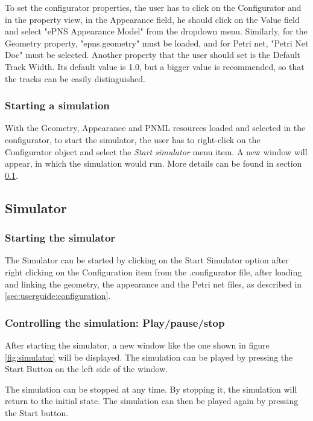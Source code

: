 To set the configurator properties, the user has to click on the Configurator and in the property view, in the Appearance field, he should click on the Value field and select "ePNS Appearance Model" from the dropdown menu. Similarly, for the Geometry property, "epns.geometry" must be loaded, and for Petri net, "Petri Net Doc" must be selected. Another property that the user should set is the Default Track Width. Its default value is 1.0, but a bigger value is recommended, so that the tracks can be easily distinguished.

\subsubsection{Starting a simulation}
With the Geometry, Appearance and PNML resources loaded and selected in the configurator, to start
the simulator, the user has to right-click on the Configurator object and select the \textit{Start
simulator} menu item. A new window will appear, in which the simulation would run. More details can
be found in section \ref{sec:userguide:simulator}.

\subsection{Simulator}
\label{sec:userguide:simulator}

\subsubsection{Starting the simulator}

The Simulator can be started by clicking on the Start Simulator option after right clicking on the Configuration 
item from the .configurator file, after loading and linking the geometry, the appearance and the Petri net files, 
as described in \ref{sec:userguide:configuration}.

\subsubsection{Controlling the simulation: Play/pause/stop}
After starting the simulator, a new window like the one shown in figure \ref{fig:simulator} will be displayed.
The simulation can be played by pressing the Start Button on the left side of the window. 

The simulation can be stopped at any time. By stopping it, the simulation will return to the initial state. The 
simulation can then be played again by pressing the Start button.

